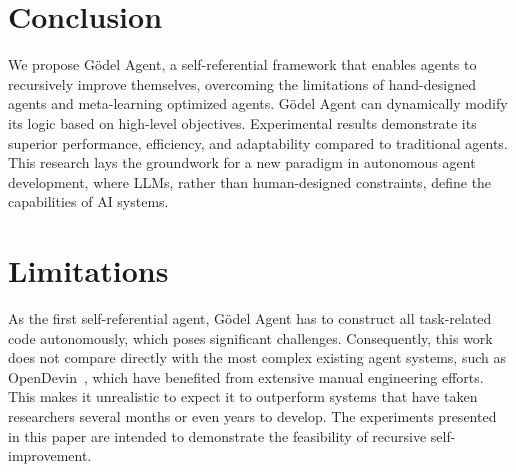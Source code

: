 \documentclass[11pt]{article}
\newcommand{\framework}{Gödel Agent\xspace}
\newcommand{\method}{Roz\xspace}
\begin{document}





\section{Conclusion}

We propose \framework, a self-referential framework that enables agents to recursively improve themselves, overcoming the limitations of hand-designed agents and meta-learning optimized agents.  \framework can dynamically modify its logic based on high-level objectives. Experimental results demonstrate its superior performance, efficiency, and adaptability compared to traditional agents. 
This research lays the groundwork for a new paradigm in autonomous agent development, where LLMs, rather than human-designed constraints, define the capabilities of AI systems. 


\section*{Limitations}

As the first self-referential agent, \framework has to construct all task-related code autonomously, which poses significant challenges. Consequently, this work does not compare directly with the most complex existing agent systems, such as OpenDevin~\citep{wang2024opendevinopenplatformai}, which have benefited from extensive manual engineering efforts. 
This makes it unrealistic to expect it to outperform systems that have taken researchers several months or even years to develop. The experiments presented in this paper are intended to demonstrate the feasibility of recursive self-improvement. 
\end{document}
